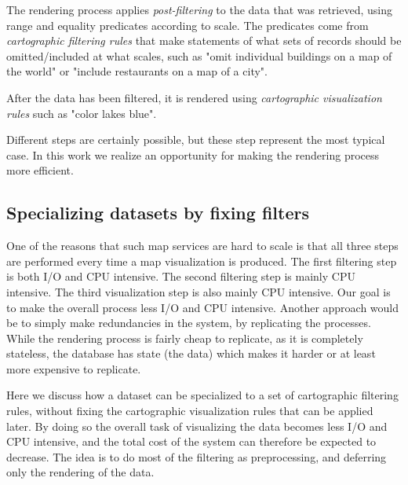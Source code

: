  The rendering process applies \emph{post-filtering} to the data that was retrieved, using range and equality predicates according to scale. The predicates come from \emph{cartographic filtering rules} that make statements of what sets of records should be omitted/included at what scales, such as "omit individual buildings on a map of the world" or "include restaurants on a map of a city".

 After the data has been filtered, it is rendered using \emph{cartographic visualization rules} such as "color lakes blue".

Different steps are certainly possible, but these step represent the most typical case. In this work we realize an opportunity for making the rendering process more efficient. 


\subsection{Specializing datasets by fixing filters}
One of the reasons that such map services are hard to scale is that all three steps are performed every time a map visualization is produced. The first filtering step is both I/O and CPU intensive. The second filtering step is mainly CPU intensive. The third visualization step is also mainly CPU intensive. Our goal is to make the overall process less I/O and CPU intensive. Another approach would be to simply make redundancies in the system, by replicating the processes. While the rendering process is fairly cheap to replicate, as it is completely stateless, the database has state (the data) which makes it harder or at least more expensive to replicate.

Here we discuss how a dataset can be specialized to a set of cartographic filtering rules, without fixing the cartographic visualization rules that can be applied later. By doing so the overall task of visualizing the data becomes less I/O and CPU intensive, and the total cost of the system can therefore be expected to decrease. The idea is to do most of the filtering as preprocessing, and deferring only the rendering of the data.

